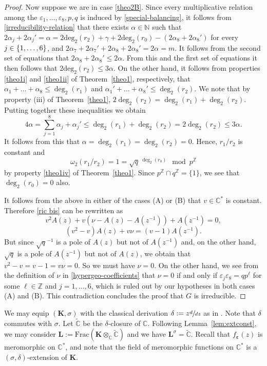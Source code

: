 \documentclass[JEP,XML,SOM,Unicode]{cedram}
\theoremstyle{definition}
\newcommand{\N}{\mathbb N}
\newcommand{\Z}{\mathbb Z}
\newcommand{\C}{\mathbb C}
\newcommand\K{\boldsymbol{K}}
\renewcommand\L{\boldsymbol{L}}
\let\d\delta
\let\s\sigma
\newcommand{\degr}[1]{\deg_{#1}}
\newcommand{\subeps}{\boldsymbol{\varepsilon}}
\begin{document}
\begin{proof}
Now suppose we are in case \eqref{theo2B}. Since every multiplicative relation among the $\varepsilon_{1},\dots,\varepsilon_{8},p,q$ is induced by \eqref{special-balancing}, it follows from \eqref{irreducibility-relation} that there exists $\alpha\in\N$ such that $2\alpha_j+2\alpha_j'=\alpha=2\mathrm{deg}_2(r_2)+\gamma+2\mathrm{deg}_2(r_0)-(2\alpha_8+2\alpha_8')$ for every $j\in\nobreak\{1,\dots,6\}$, and $2\alpha_7+2\alpha_7'+2\alpha_8+2\alpha_8'=2\alpha=m$. It follows from the second set of equations that $2\alpha_8+2\alpha_8'\leq 2\alpha$. From this and the first set of equations it then follows that $2\mathrm{deg}_2(r_2)\leq 3\alpha$. On the other hand, it follows from properties \eqref{theo1i} and \eqref{theo1ii} of Theorem~\ref{theo1}, respectively, that $\alpha_1+\dots+\alpha_8\leq\degr{2}(r_1)$ and $\alpha_1'+\dots+\alpha_8'\leq\degr{2}(r_2)$. We note that by property (iii) of Theorem~\ref{theo1}, $2\degr{2}(r_2)=\degr{2}(r_1)+\degr{2}(r_2)$. Putting together these inequalities we obtain
\[
4\alpha=\sum_{j=1}^8\alpha_j+\alpha_j'\leq\degr{2}(r_1)+\degr{2}(r_2)=2\degr{2}(r_2)\leq 3\alpha.
\]
It follows from this that $\alpha=\degr{2}(r_1)=\degr{2}(r_2)=0$. Hence, $r_1/r_2$ is constant and
\[
\omega_2(r_1/r_2)=1=\sqrt{q}\,^{\degr{2}(r_0)} \mod p^\Z
\]
by property \eqref{theo1iv} of Theorem~\ref{theo1}. Since $p^\Z\cap q^\Z=\{1\}$, we see that ${\degr{2}(r_0)=0}$ also.

It follows from the above in either of the cases (A) or (B) that $v\in \C^{*}$ is constant. Therefore \eqref{ric bis} can be rewritten as
\begin{equation}\label{eq1}
v^{2}A(z)+v(\nu-A(z)-A(z^{-1}))+A(z^{-1})=0,
\end{equation}
\ie
\begin{equation}\label{eq1bis}
(v^{2}-v)A(z)+v\nu=(v-1)A(z^{-1}).
\end{equation}
But since $\sqrt{q}^{-1}$ is a pole of $A(z)$ but not of $A(z^{-1})$ and, on the other hand, $\sqrt{q}$ is a pole of $A(z^{-1})$ but not of $A(z)$, we obtain that $v^{2}-v=v-1=v\nu=0$. So we must have $\nu=0$. On the other hand, we see from the definition of $\nu$ in \eqref{hypergeo-coefficients} that $\nu=0$ if and only if $\varepsilon_j\varepsilon_8=qp^\ell$ for some $\ell\in\mathbb{Z}$ and $j=1,\dots,6$, which is ruled out by our hypotheses in both cases (A) and (B).
This contradiction concludes the proof that $G$ is irreducible.
\end{proof}

We may equip $(\K,\s)$ with the classical derivation $\d:=z\sfrac{d}{dz}$ as in \cite[\S 3.1]{dreyfus2018nature}. Note that $\d$ commutes with $\s$. Let $\widetilde{\C}$ be the $\d$-closure of $\C$. Following Lemma~\ref{lem:extconst}, we may consider $\L:=\mathrm{Frac} (\K\otimes_{\C}\widetilde{\C})$ and we have $\L^{\s}= \widetilde{\C}$. Recall that $f_{\subeps}(z)$ is meromorphic on $\C^{*}$, and note that the field of meromorphic functions on $\C^*$ is a $(\sigma,\delta)$-extension of $\K$.
\end{document}

